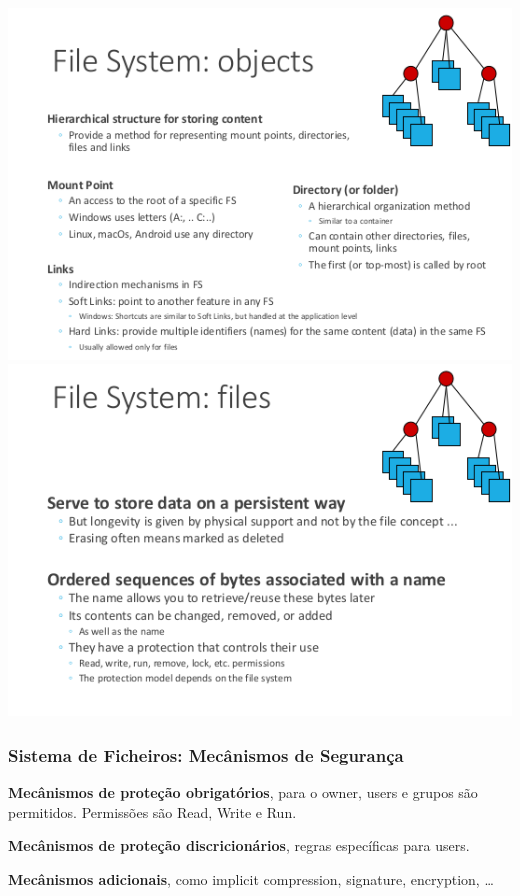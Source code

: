 \documentclass{article}
\begin{document}
\begin{center}
  \includegraphics[scale=0.4]{31}
  \includegraphics[scale=0.4]{32}
\end{center}

\pagebreak

\subsubsection{Sistema de Ficheiros: Mecânismos de Segurança}

\begin{flushleft}
  \textbf{Mecânismos de proteção obrigatórios}, para o owner,
  users e grupos são permitidos. Permissões são Read, Write e Run.

  \vspace{2mm}

  \textbf{Mecânismos de proteção discricionários}, regras específicas
  para users.

  \vspace{2mm}

  \textbf{Mecânismos adicionais}, como implicit compression,
  signature, encryption, \dots
\end{flushleft}
\end{document}
